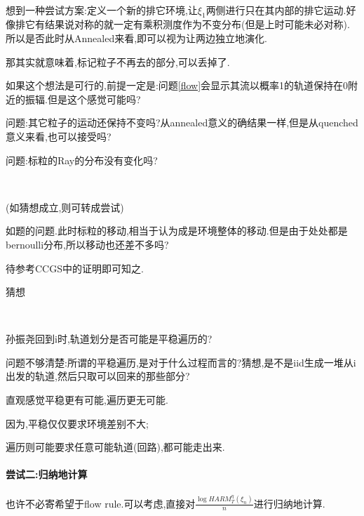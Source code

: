 					\begin{tri}[拆成两部分不相关的排它环境]
						\label{separate}
						\ 

						想到一种尝试方案:定义一个新的排它环境,让$\xi_1$两侧进行只在其内部的排它运动.好像排它有结果说对称的就一定有乘积测度作为不变分布(但是上时可能未必对称).所以是否此时从Annealed来看,即可以视为让两边独立地演化.

						那其实就意味着,标记粒子不再去的部分,可以丢掉了.

						如果这个想法是可行的,前提一定是:问题\ref{flow}会显示其流以概率1的轨道保持在0附近的振辐.但是这个感觉可能吗?

						问题:其它粒子的运动还保持不变吗?从annealed意义的确结果一样,但是从quenched意义来看,也可以接受吗?

						问题:标粒的Ray的分布没有变化吗?
					\end{tri}

					\begin{conjec}
						\label{free tagged}
						\ 

						(如猜想成立,则可转成尝试)

						如题的问题.此时标粒的移动,相当于认为成是环境整体的移动.但是由于处处都是bernoulli分布,所以移动也还差不多吗?

						待参考CCGS中的证明即可知之.

						猜想
					\end{conjec}

					\begin{conjec}[轨道划分的角度来看]
						\label{pathcut}
						\ 

						孙振尧回到i时,轨道划分是否可能是平稳遍历的?

						问题不够清楚:所谓的平稳遍历,是对于什么过程而言的?猜想,是不是iid生成一堆从i出发的轨道,然后只取可以回来的那些部分?

						直观感觉平稳更有可能,遍历更无可能.

						因为,平稳仅仅要求环境差别不大;

						遍历则可能要求任意可能轨道(回路),都可能走出来.

					\end{conjec}

			\paragraph*{尝试二:归纳地计算}
			\quad %

				也许不必寄希望于flow rule.可以考虑,直接对$\displaystyle\frac{\log HARM^{\eta}_T(\xi_n)}{n}$进行归纳地计算.

